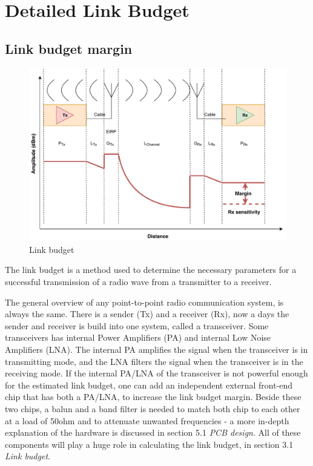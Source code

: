 \newpage

\section{Detailed Link Budget}
\subsection{Link budget margin}







\begin{figure}[h]
\centering
\hspace*{-2cm}
\includegraphics[scale=1.1]{figures/link_budget.pdf}
\caption{Link budget}
\end{figure}

The link budget is a method used to determine the necessary parameters for a successful transmission of a radio wave from a transmitter to a receiver.  

The general overview of any point-to-point radio communication system, is always the same. There is a sender (Tx) and a receiver (Rx), now a days the sender and receiver is build into one system, called a transceiver. Some transceivers has internal Power Amplifiers (PA) and internal Low Noise Amplifiers (LNA). The internal PA amplifies the signal when the transceiver is in transmitting mode, and the LNA filters the signal when the transceiver is in the receiving mode. If the internal PA/LNA of the transceiver is not powerful enough for the estimated link budget, one can add an independent external front-end chip that has both a PA/LNA, to increase the link budget margin. Beside these two chips, a balun and a band filter is needed to match both chip to each other at a load of 50ohm and to attenuate unwanted frequencies - a more in-depth explanation of the hardware is discussed in section 5.1 \textit{PCB design}. All of these components will play a huge role in calculating the link budget, in section 3.1 \textit{Link budget}. 

